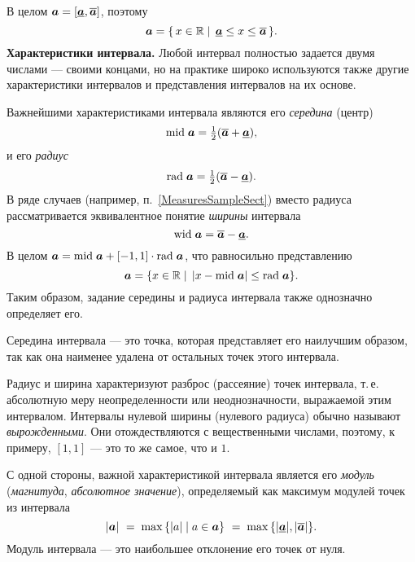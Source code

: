 \documentclass[a5paper,openany]{book}
\newcommand{\mbf}[1]{\protect\text{\boldmath$#1$}}
\newcommand{\mbb}{\mathbb}
\newcommand{\ov}{\overline}
\newcommand{\un}{\underline}
\newcommand{\m}{\mathrm{mid}\;}
\newcommand{\w}{\mathrm{wid}\;}
\renewcommand{\r}{\mathrm{rad}\;}
\begin{document}
{{В целом $\mbf{a} = [\un{\mbf{a}}, \ov{\mbf{a}}]$, поэтому
\begin{equation}
	\label{LowUpRepres}
	\mbf{a} = \{\,x\in\mbb{R} \mid \,\un{\mbf{a}}\leq x\leq \ov{\mbf{a}}\,\}.
\end{equation} 
{\bf Характеристики интервала.} \label{InrevalProp}
Любой интервал полностью задается двумя числами --- своими концами, но на практике 
широко используются также другие характеристики интервалов и представления интервалов 
на их основе. 

Важнейшими характеристиками интервала являются его \emph{середина} (центр) 
\begin{equation}\label{midint}
	\textstyle\index{середина интервала} 
	\m\mbf{a} = \frac{1}{2}(\ov{\mbf{a}} + \un{\mbf{a}}),
\end{equation}
и его \emph{радиус} 
\begin{equation}\label{radint} 	\textstyle\index{радиус интервала}
	\r\mbf{a} = \frac{1}{2}(\ov{\mbf{a}} - \un{\mbf{a}}).
\end{equation} 
В ряде случаев (например, п.~\ref{MeasuresSampleSect}) вместо радиуса рассматривается эквивалентное понятие \emph{ширины} 
интервала   
\begin{equation}\label{widint}
	\w\mbf{a} = \ov{\mbf{a}} - \un{\mbf{a}}. 
\end{equation}
В целом $\mbf{a} = \m\mbf{a} + [-1, 1]\cdot\r\mbf{a}$, что равносильно представлению 
\begin{equation}
	\label{MidRadRepres}
	\mbf{a} = \{x\in\mbb{R} \mid \,|x-\m\mbf{a}|\leq \r\mbf{a}\}.
\end{equation} 
Таким образом, задание середины и радиуса интервала также однозначно определяет его.

Середина интервала --- это точка, которая представляет его наилучшим образом, 
так как она наименее удалена от остальных точек этого интервала. 

Радиус и ширина характеризуют разброс (рассеяние) точек интервала, т.\,е. абсолютную 
меру неопределенности или неоднозначности, выражаемой этим интервалом. 
Интервалы нулевой ширины (нулевого радиуса) обычно называют  
\textit{вырожденными}. Они отождествляются с вещественными числами, поэтому, 
к примеру, $[1, 1]$ --- это то же самое, что и $1$. 

С одной стороны, важной характеристикой интервала является его \textit{модуль} (\emph{магнитуда}, \textit{абсолютное 	значение}),  определяемый как максимум модулей точек из интервала 
\begin{equation*} 
	\index{магнитуда}\index{модуль интервала}  
	|\mbf{a}|\  = \;\max\,\{  |a| \mid a\in\mbf{a} \} \ 
	= \;\max\,\{  |\un{\mbf{a}}|, |\ov{\mbf{a}}|  \}.  
\end{equation*} 
Модуль интервала --- это наибольшее отклонение его точек от нуля. 

}}
\end{document}
